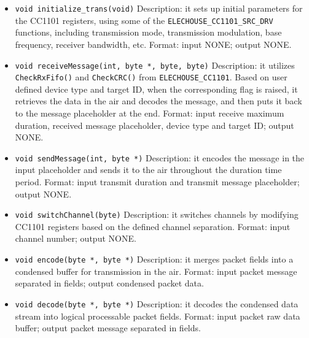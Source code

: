 \begin{itemize}
  \item \texttt{void initialize\_trans(void)}\newline
  Description: it sets up initial parameters for the CC1101 registers, using some of the \texttt{ELECHOUSE\_CC1101\_SRC\_DRV} functions, including transmission mode, transmission modulation, base frequency, receiver bandwidth, etc.\newline
  Format: input NONE; output NONE.
  \item \texttt{void receiveMessage(int, byte *, byte, byte)}\newline
  Description: it utilizes \texttt{CheckRxFifo()} and \texttt{CheckCRC()} from \texttt{ELECHOUSE\_CC1101}. Based on user defined device type and target ID, when the corresponding flag is raised, it retrieves the data in the air and decodes the message, and then puts it back to the message placeholder at the end.\newline
  Format: input receive maximum duration, received message placeholder, device type and target ID; output NONE.
  \item \texttt{void sendMessage(int, byte *)}\newline
  Description: it encodes the message in the input placeholder and sends it to the air throughout the duration time period.\newline
  Format: input transmit duration and transmit message placeholder; output NONE.
  \item \texttt{void switchChannel(byte)}\newline
  Description: it switches channels by modifying CC1101 registers based on the defined channel separation.\newline
  Format: input channel number; output NONE.
  \item \texttt{void encode(byte *, byte *)}\newline
  Description: it merges packet fields into a condensed buffer for transmission in the air.\newline
  Format: input packet message separated in fields; output condensed packet data.
  \item \texttt{void decode(byte *, byte *)}\newline
  Description: it decodes the condensed data stream into logical processable packet fields. \newline
  Format: input packet raw data buffer; output packet message separated in fields.
\end{itemize}

